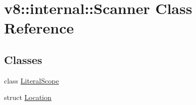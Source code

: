 \hypertarget{classv8_1_1internal_1_1_scanner}{}\section{v8\+:\+:internal\+:\+:Scanner Class Reference}
\label{classv8_1_1internal_1_1_scanner}
\subsection*{Classes}
\begin{DoxyCompactItemize}
\item 
class \hyperlink{classv8_1_1internal_1_1_scanner_1_1_literal_scope}{Literal\+Scope}
\item 
struct \hyperlink{structv8_1_1internal_1_1_scanner_1_1_location}{Location}
\end{DoxyCompactItemize}
